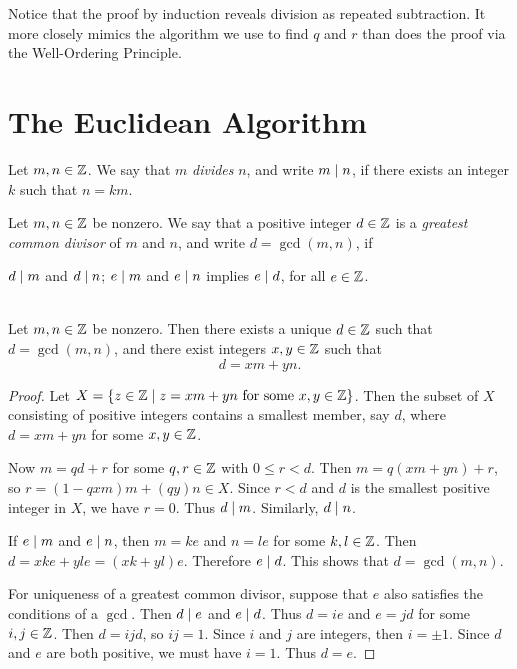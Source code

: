 \documentclass{amsart}
\begin{document}
Notice that the proof by induction reveals division as repeated subtraction.
It more closely mimics the algorithm we use to find $q$ and $r$ than
does the proof via the Well-Ordering Principle.

\newpage

\section{The Euclidean Algorithm}

\begin{Def}
Let $m,n \in \mathbb{Z}$.  We say that $m$ {\em divides} $n$, and write
$m \mid n$, if there exists an integer $k$ such that $n = km$.
\end{Def}

\begin{Def}
Let $m,n \in \mathbb{Z}$ be nonzero.  We say that a positive integer $d \in \mathbb{Z}$
is a {\em greatest common divisor} of $m$ and $n$,
and write $d = \gcd(m,n)$, if
\begin{itemize}
 $d \mid m$ and $d \mid n$;
 $e \mid m$ and $e \mid n$ implies $e \mid d$, for all $e \in \mathbb{Z}$.
\end{itemize}
\end{Def}

\begin{Prop}  \\
Let $m,n \in \mathbb{Z}$ be nonzero. Then there exists a unique $d \in
\mathbb{Z}$ such that $d = \gcd(m,n)$, and there exist integers $x,y \in
\mathbb{Z}$ such that
\[ d = xm + yn . \]
\end{Prop}

\begin{proof}
Let $X = \{ z \in \mathbb{Z} \mid z = xm + yn \text{ for some } x,y \in
\mathbb{Z} \}$. Then the subset of $X$ consisting of positive integers
contains a smallest member, say $d$, where $d = xm + yn$ for some
$x,y \in \mathbb{Z}$.

Now $m = qd + r$ for some $q,r \in \mathbb{Z}$ with $0 \le r < d$. Then
$m = q(xm+yn) + r$, so $r = (1 - qxm)m + (qy)n \in X$. Since $r <
d$ and $d$ is the smallest positive integer in $X$, we have $r =
0$.  Thus $d \mid m$.  Similarly, $d \mid n$.

If $e \mid m$ and $e \mid n$, then $m = ke$ and $n = le$
for some $k,l \in \mathbb{Z}$. Then $d = xke + yle = (xk+yl)e$.
Therefore $e \mid d$. This shows that $d = \gcd(m,n)$.

For uniqueness of a greatest common divisor, suppose that $e$ also
satisfies the conditions of a $\gcd$.  Then $d \mid e$ and $e
\mid d$. Thus $d = ie$ and $e = jd$ for some $i,j \in \mathbb{Z}$.
Then $d = ijd$, so $ij = 1$.  Since $i$ and $j$ are integers, then
$i = \pm 1$.  Since $d$ and $e$ are both positive, we must have $i
= 1$.  Thus $d = e$.
\end{proof}
\end{document}
